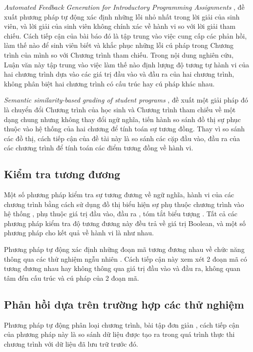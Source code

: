 \textit{Automated Feedback Generation for Introductory Programming
  Assignments} \cite{singh2013automated}, đề xuất phương pháp tự động
xác định những lỗi nhỏ nhất trong lời giải của sinh viên, và lời giải
của sinh viên không chính xác về hành vi so với lời giải tham
chiếu. Cách tiếp cận của bài báo đó là tập trung vào việc cung cấp các
phản hồi, làm thế nào để sinh viên biết và khắc phục những lỗi cú pháp
trong Chương trình của mình so với Chương trình tham chiếu. Trong nội
dung nghiên cứu, Luận văn này tập trung vào việc làm thế nào định
lượng độ tương tự hành vi của hai chương trình dựa vào các giá trị đầu
vào và đầu ra của hai chương trình, không phân biệt hai chương trình
có cấu trúc hay cú pháp khác nhau.

\textit{Semantic similarity-based grading of student programs}
\cite{wang2007semantic}, đề xuất một giải pháp đó là chuyển đổi Chương
trình của học sinh và Chương trình tham chiếu về một dạng chung nhưng
không thay đổi ngữ nghĩa, tiến hành so sánh đồ thị sự phục thuộc vào
hệ thống của hai chương để tính toán sự tương đồng. Thay vì so sánh
các đồ thị, cách tiếp cận của đề tài này là so sánh các cặp đầu vào,
đầu ra của các chương trình để tính toán các điểm tương đồng về hành
vi.
	
\subsection*{Kiểm tra tương đương}
Một số phương pháp kiểm tra sự tương đương về ngữ nghĩa, hành vi của
các chương trình bằng cách sử dụng đồ thị biểu hiện sự phụ thuộc
chương trình vào hệ thống \cite{bates1993incremental}
\cite{binkley1992using}, phụ thuộc giá trị đầu vào, đầu ra
\cite{jackson1994semantic}, tóm tắt biểu tượng
\cite{person2008differential}. Tất cả các phương pháp kiểm tra độ
tương đương này đều trả về giá trị Boolean, và một số phương pháp cho
kết quả về hành vi là như nhau.
	
Phương pháp tự động xác định những đoạn mã tương đương nhau về chức
năng thông qua các thử nghiệm ngẫu nhiên
\cite{jiang2009automatic}. Cách tiếp cận này xem xét 2 đoạn mã có
tương đương nhau hay không thông qua giá trị đầu vào và đầu ra, không
quan tâm đến cấu trúc và cú pháp của 2 đoạn mã.
	
\subsection*{Phản hồi dựa trên trường hợp các thử nghiệm}

Phương pháp tự động phân loại chương trình, bài tập đơn giản
\cite{hext1969automatic}, cách tiếp cận của phương pháp này là so sánh
dữ liệu được tạo ra trong quá trình thực thi chương trình với dữ liệu
đã lưu trữ trước đó.
	
